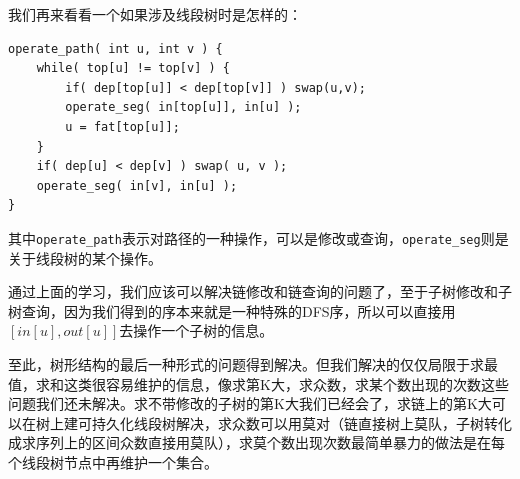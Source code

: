 \documentclass{beamer}
\begin{document}
		\begin{frame}[fragile=singleslide]
			我们再来看看一个如果涉及线段树时是怎样的：
			\begin{verbatim}
operate_path( int u, int v ) {
    while( top[u] != top[v] ) {
        if( dep[top[u]] < dep[top[v]] ) swap(u,v);
        operate_seg( in[top[u]], in[u] );
        u = fat[top[u]];
    }
    if( dep[u] < dep[v] ) swap( u, v );
    operate_seg( in[v], in[u] );
}
			\end{verbatim}
			
			其中\texttt{operate\_path}表示对路径的一种操作，可以是修改或查询，\texttt{operate\_seg}则是关于线段树的某个操作。
		\end{frame}
		\begin{frame}
			通过上面的学习，我们应该可以解决链修改和链查询的问题了，至于子树修改和子树查询，因为我们得到的序本来就是一种特殊的DFS序，所以可以直接用$[in[u],out[u]]$去操作一个子树的信息。
			
			至此，树形结构的最后一种形式的问题得到解决。但我们解决的仅仅局限于求最值，求和这类很容易维护的信息，像求第K大，求众数，求某个数出现的次数这些问题我们还未解决。求不带修改的子树的第K大我们已经会了，求链上的第K大可以在树上建可持久化线段树解决，求众数可以用莫对（链直接树上莫队，子树转化成求序列上的区间众数直接用莫队），求莫个数出现次数最简单暴力的做法是在每个线段树节点中再维护一个集合。
		\end{frame}
\end{document}
